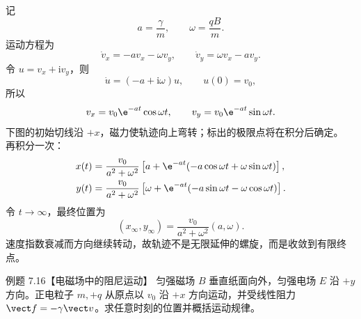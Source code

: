 \begin{xesolution}
记
\[
  a=\frac\gamma m,
  \qquad \omega=\frac{qB}{m}.
\]
运动方程为
\[
  \dot v_x=-av_x-\omega v_y,
  \qquad
  \dot v_y=\omega v_x-av_y.
\]
令 $u=v_x+\mathrm i v_y$，则
\[
  \dot u=(-a+\mathrm i\omega)u,
  \qquad u(0)=v_0,
\]
所以
\begin{equation}
  v_x=v_0\e^{-at}\cos\omega t,
  \qquad
  v_y=v_0\e^{-at}\sin\omega t.
\end{equation}
下图的初始切线沿 $+x$，磁力使轨迹向上弯转；标出的极限点将在积分后确定。
\dampedSpiralDiagram
再积分一次：
\begin{align}
  x(t)&=\frac{v_0}{a^2+\omega^2}
  \left[a+\e^{-at}(-a\cos\omega t+\omega\sin\omega t)\right],\\
  y(t)&=\frac{v_0}{a^2+\omega^2}
  \left[\omega+\e^{-at}(-a\sin\omega t-\omega\cos\omega t)\right].
\end{align}
令 $t\to\infty$，最终位置为
\begin{equation}
  \boxed{(x_\infty,y_\infty)=
  \frac{v_0}{a^2+\omega^2}(a,\omega)}.
\end{equation}
速度指数衰减而方向继续转动，故轨迹不是无限延伸的螺旋，而是收敛到有限终点。

\end{xesolution}

\Needspace{0.47\textheight}
\begin{origexamplebox}{例题 7.16【电磁场中的阻尼运动】}
匀强磁场 $B$ 垂直纸面向外，匀强电场 $E$ 沿 $+y$ 方向。正电粒子 $m,+q$ 从原点以 $v_0$ 沿
$+x$ 方向运动，并受线性阻力 $\vect f=-\gamma\vect v$。求任意时刻的位置并概括运动规律。
\end{origexamplebox}

